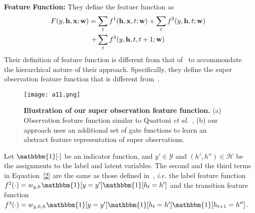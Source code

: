 \documentclass[10pt,twocolumn,letterpaper]{article}
\begin{document}
{\bf Feature Function:} They define the featuer function as~\cite{action}\\
\begin{gather}
\label{2}
F(y,\mathbf{h},\mathbf{x};\mathbf{w}) = \sum_tf^1(\mathbf{h},\mathbf{x},t;\mathbf{w}) + \sum_tf^2(y,\mathbf{h},t;\mathbf{w})\\ \notag 
+ \sum_tf^3(y,\mathbf{h},t,t+1;\mathbf{w})
\end{gather}
Their definition of feature function is different from that of~\cite{Hidden} to accommondate the hierarchical nature of their approach. Specifically, they define the super observation feature function that is different from~\cite{Hidden}.

\begin{figure}
\begin{center}
\texttt{[image: a11.png]}
\end{center}
\caption{{\bf Illustration of our super observation feature function.} (a) Observation feature function similar to Quattoni \emph{et al.}~\cite{Hidden}, (b) our approach uses an additional set of gate functions to learn an abstract feature representation of super observations.}
\label{fig1}
\end{figure}

\balance

Let $\mathbbm{1}[\cdot]$ be an indicator function, and $y' \in \mathcal{Y}$ and $(h',h'') \in \mathcal{H}$ be the assignments to the label and latent variables. The second and the third terms in Equation~\ref{2} are the same as those defined in~\cite{Hidden}, \emph{i.e.} the label feature function $f^2(\cdot) = w_{y,h}\mathbbm{1}[y = y']\mathbbm{1}[h_t = h']$ and the transition feature function $f^3(\cdot) = w_{y,h,h}\mathbbm{1}[y = y']\mathbbm{1}[h_t = h']\mathbbm{1}[h_{t+1} = h'']$.
\end{document}
